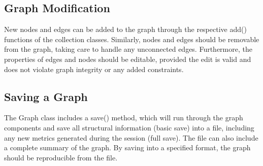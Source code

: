 \begin{design}
\subsection{Graph Modification}
New nodes and edges can be added to the graph through the respective add() functions of the collection classes. Similarly, nodes and edges should be removable from the graph, taking care to handle any unconnected edges. Furthermore, the properties of edges and nodes should be editable, provided the edit is valid and does not violate graph integrity or any added constraints. 
\subsection{Saving a Graph}
The Graph class includes a save() method, which will run through the graph components and save all structural information (basic save) into a file, including any new metrics generated during the session (full save). The file can also include a complete summary of the graph. By saving into a specified format, the graph should be reproducible from the file.

\end{design}
